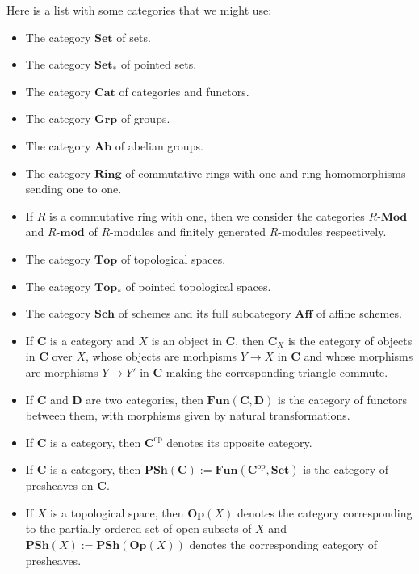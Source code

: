\documentclass[12pt,a4paper]{amsart}
\theoremstyle{plain}
\theoremstyle{definition}
\theoremstyle{remark}
\begin{document}
Here is a list with some categories that we might use:
\begin{itemize}
  \item The category $\mathbf{Set}$ of sets.
  \item The category $\mathbf{Set}_{*}$ of pointed sets.
  \item The category $\mathbf{Cat}$ of categories and functors.
  \item The category $\mathbf{Grp}$ of groups.
  \item The category $\mathbf{Ab}$ of abelian groups.
  \item The category $\mathbf{Ring}$ of commutative rings with one and ring homomorphisms sending one to one.
  \item If $R$ is a commutative ring with one, then we consider the categories $R$-$\mathbf{Mod}$ and $R$-$\mathbf{mod}$ of $R$-modules and finitely generated $R$-modules respectively.
  \item The category $\mathbf{Top}$ of topological spaces.
  \item The category $\mathbf{Top}_{*}$ of pointed topological spaces.
  \item The category $\mathbf{Sch}$ of schemes and its full subcategory $\mathbf{Aff}$ of affine schemes.
  \item If $\mathbf{C}$ is a category and $X$ is an object in $\mathbf{C}$, then $\mathbf{C}_{X}$ is the category of objects in $\mathbf{C}$ over $X$, whose objects are morhpisms $Y \to X$ in $\mathbf{C}$ and whose morphisms are morphisms $Y \to Y'$ in $\mathbf{C}$ making the corresponding triangle commute.
  \item If $\mathbf{C}$ and $\mathbf{D}$ are two categories, then $\mathbf{Fun}(\mathbf{C},\mathbf{D})$ is the category of functors between them, with morphisms given by natural transformations.
  \item If $\mathbf{C}$ is a category, then $\mathbf{C}^{\mathrm{op}}$ denotes its opposite category.
  \item If $\mathbf{C}$ is a category, then $\mathbf{PSh}(\mathbf{C}):= \mathbf{Fun}(\mathbf{C}^{\mathrm{op}},\mathbf{Set})$ is the category of presheaves on $\mathbf{C}$.
  \item If $X$ is a topological space, then $\mathbf{Op}(X)$ denotes the category corresponding to the partially ordered set of open subsets of $X$ and $\mathbf{PSh}(X) := \mathbf{PSh}(\mathbf{Op}(X))$ denotes the corresponding category of presheaves.
\end{itemize}
\end{document}

